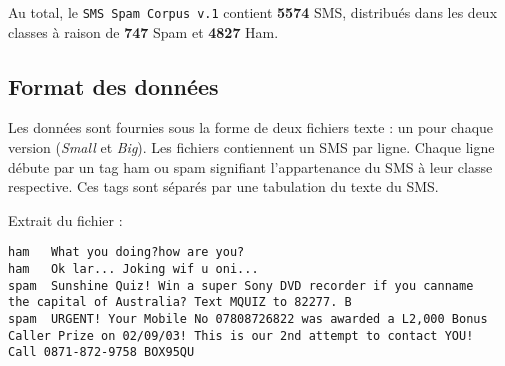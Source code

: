 Au total, le \texttt{SMS Spam Corpus v.1} contient \textbf{5574} SMS, distribués dans les deux classes à raison de \textbf{747} Spam et \textbf{4827} Ham.

\subsection*{Format des données}

Les données sont fournies sous la forme de deux fichiers texte : un pour chaque version (\textit{Small} et \textit{Big}). Les fichiers contiennent un SMS par ligne. Chaque ligne débute  par un tag \og ham \fg{} ou \og spam \fg{} signifiant l'appartenance du SMS à leur classe respective. Ces tags sont séparés par une tabulation du texte du SMS.

Extrait du fichier :

\begin{verbatim}
ham   What you doing?how are you?
ham   Ok lar... Joking wif u oni...
spam  Sunshine Quiz! Win a super Sony DVD recorder if you canname 
the capital of Australia? Text MQUIZ to 82277. B
spam  URGENT! Your Mobile No 07808726822 was awarded a L2,000 Bonus 
Caller Prize on 02/09/03! This is our 2nd attempt to contact YOU! 
Call 0871-872-9758 BOX95QU
\end{verbatim}